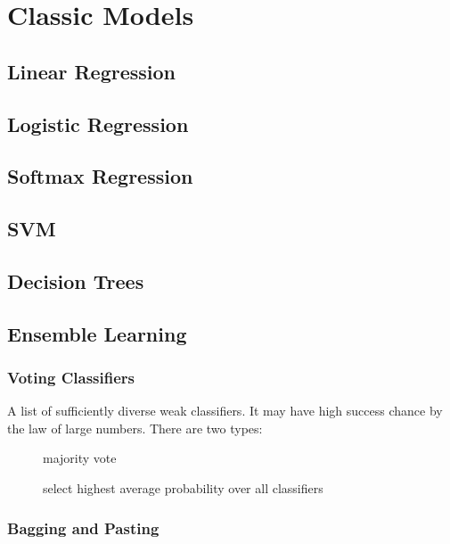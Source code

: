 \section{Classic Models}

\subsection{Linear Regression}

\subsection{Logistic Regression}

\subsection{Softmax Regression}

\subsection{SVM}

\subsection{Decision Trees}

\subsection{Ensemble Learning}

\subsubsection{Voting Classifiers}

A list of sufficiently diverse weak classifiers. It may have high success chance by the law of large numbers. There are two types:

\begin{description}
	\item [] majority vote
	\item [] select highest average probability over all classifiers
\end{description}

\subsubsection{Bagging and Pasting}

